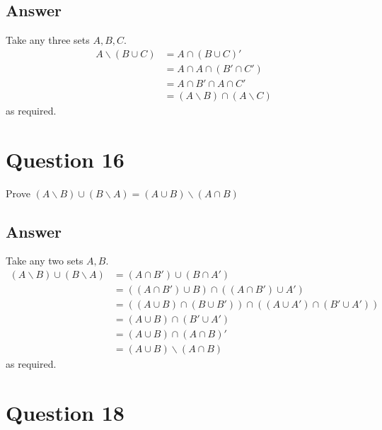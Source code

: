 \documentclass[
	12pt, %
]{fphw}
\newcommand\qed{\text{$\blacksquare$}}
\begin{document}

\subsection*{Answer}
 Take any three sets $A, B, C$.
\begin{align*}
A \backslash (B \cup C) &= A \cap (B \cup C)'\\
&= A \cap A \cap (B' \cap C')\\
&= A \cap B' \cap A \cap C'\\
&= (A \backslash B) \cap (A \backslash C)
\end{align*}
as required. \qed

\newpage


\section*{Question 16}

\begin{problem}
Prove $(A \backslash B) \cup (B \backslash A) = (A \cup B) \backslash (A \cap B)$
\end{problem}


\subsection*{Answer}
Take any two sets $A, B$.
\begin{align*}
(A \backslash B) \cup (B \backslash A) &= (A \cap B') \cup (B \cap A')\\
&= ((A \cap B') \cup B) \cap ((A \cap B') \cup A')\\
&= ((A \cup B) \cap (B \cup B')) \cap ((A \cup A') \cap (B' \cup A'))\\
&=(A \cup B) \cap (B' \cup A')\\
&= (A \cup B) \cap (A \cap B)'\\
&= (A \cup B) \backslash (A \cap B)
\end{align*}
as required. \qed

\section*{Question 18}
\end{document}
